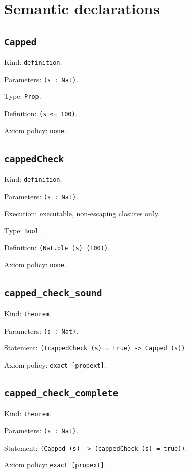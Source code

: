 \documentclass[11pt]{article}
\begin{document}
\section*{Semantic declarations}
\subsection*{\texttt{Capped}}
\noindent Kind: \texttt{definition}.\par
\noindent Parameters: \texttt{(s : Nat)}.\par
\noindent Type: \texttt{Prop}.\par
\noindent Definition: \texttt{(s <= 100)}.\par
\noindent Axiom policy: \texttt{none}.\par
\subsection*{\texttt{cappedCheck}}
\noindent Kind: \texttt{definition}.\par
\noindent Parameters: \texttt{(s : Nat)}.\par
\noindent Execution: executable, non-escaping closures only.\par
\noindent Type: \texttt{Bool}.\par
\noindent Definition: \texttt{(Nat.ble (s) (100))}.\par
\noindent Axiom policy: \texttt{none}.\par
\subsection*{\texttt{capped\_check\_sound}}
\noindent Kind: \texttt{theorem}.\par
\noindent Parameters: \texttt{(s : Nat)}.\par
\noindent Statement: \texttt{((cappedCheck (s) = true) -> Capped (s))}.\par
\noindent Axiom policy: \texttt{exact [propext]}.\par
\subsection*{\texttt{capped\_check\_complete}}
\noindent Kind: \texttt{theorem}.\par
\noindent Parameters: \texttt{(s : Nat)}.\par
\noindent Statement: \texttt{(Capped (s) -> (cappedCheck (s) = true))}.\par
\noindent Axiom policy: \texttt{exact [propext]}.\par
\end{document}
